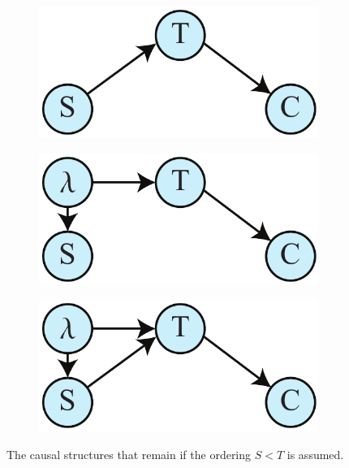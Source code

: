 \documentclass[12pt,onecolumn,nofootinbib]{revtex4-2}
\begin{document}
\begin{figure}[h]
		\hspace{4em}
	        \begin{subfigure}[b]{0.2\textwidth}
                	\centering
                	\includegraphics[width=\textwidth]{smoke-ic-ord1}
		\end{subfigure}
		\hspace{5em}		
		\begin{subfigure}[b]{0.2\textwidth}
                	\centering
                	\includegraphics[width=\textwidth]{smoke-ic-ord2}
		\end{subfigure}
		\hspace{5em}
		\begin{subfigure}[b]{0.2\textwidth}
                	\centering
                	\includegraphics[width=\textwidth]{smoke-ic-ord3}
		\end{subfigure}
 \caption{The causal structures that remain if the ordering $S<T$ is assumed.}
       \label{fig:smoke-icstar-ord}
\end{figure}
\end{document}

